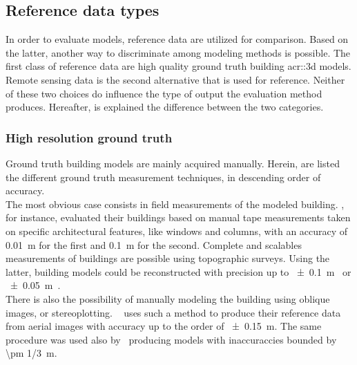     \subsection{Reference data types}
        \label{subsec::state_of_the_art::quality::reference}
        In order to evaluate models, reference data are utilized for comparison.
        Based on the latter, another way to discriminate among modeling methods is possible.
        The first class of reference data are high quality ground truth building \gls{acr::3d} models.
        Remote sensing data is the second alternative that is used for reference.
        Neither of these two choices do influence the type of output the evaluation method produces.
        Hereafter, is explained the difference between the two categories.

        \subsubsection{High resolution ground truth}
            Ground truth building models are mainly acquired manually.
            Herein, are listed the different ground truth measurement techniques, in descending order of accuracy.\\

            The most obvious case consists in field measurements of the modeled building.
            \textcite{dick2004modelling}, for instance, evaluated their buildings based on manual tape measurements taken on specific architectural features, like windows and columns, with an accuracy of \SI{0.01}{\m} for the first and \SI{0.1}{\m} for the second.
            Complete and scalables measurements of buildings are possible using topographic surveys.
            Using the latter, building models could be reconstructed with precision up to \SI{\pm 0.1}{\m}~\parencite{henricsson19973} or \SI{\pm 0.05}{\m}~\parencite{vogtle2003quality}.\\
            There is also the possibility of manually modeling the building using oblique images, or stereoplotting.
            ~\textcite{zebedin2008fusion} uses such a method to produce their reference data from aerial images with accuracy up to the order of \SI{\pm 0.15}{\m}.
            The same procedure was used also by~\textcite{jaynes2003recognition} producing models with inaccuraccies bounded by \SI[fraction-function = \sfrac]{\pm 1/3}{\m}.

